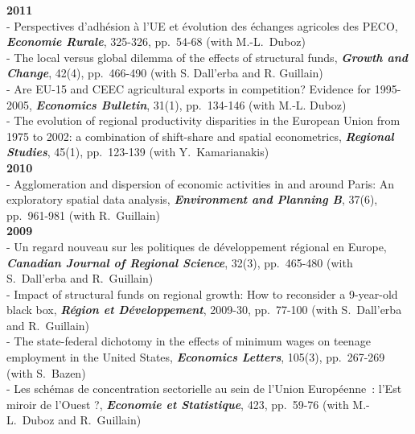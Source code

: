\documentclass[a4paper,12pt]{article}
\begin{document}
\noindent \textbf{2011}  \smallskip \\ 
- Perspectives d'adhésion à l'UE et évolution des échanges agricoles des PECO, \textit{\textbf{Economie Rurale}}, 325-326, pp.~54-68 (with M.-L.~Duboz) \\
- The local versus global dilemma of the effects of structural funds, \textit{\textbf{Growth and Change}}, 42(4), pp.~466-490 (with S. Dall'erba and R. Guillain) \\
- Are EU-15 and CEEC agricultural exports in competition? Evidence for 1995-2005, \textit{\textbf{Economics Bulletin}}, 31(1), pp.~134-146 (with M.-L. Duboz) \\
- The evolution of regional productivity disparities in the European Union from 1975 to 2002: a combination of shift-share and spatial econometrics, \textit{\textbf{Regional Studies}}, 45(1), pp.~123-139 (with Y.~Kamarianakis) \\

\noindent \textbf{2010}  \smallskip \\ 
- Agglomeration and dispersion of economic activities in and around Paris: An exploratory spatial data analysis, \textit{\textbf{Environment and Planning B}}, 37(6), pp.~961-981 (with R.~Guillain) \\

\noindent \textbf{2009}  \smallskip \\ 
- Un regard nouveau sur les politiques de développement régional en Europe, \textit{\textbf{Canadian Journal of Regional Science}}, 32(3), pp.~465-480 (with S.~Dall'erba and R.~Guillain) \\
- Impact of structural funds on regional growth: How to reconsider a 9-year-old black box, \textit{\textbf{Région et Développement}}, 2009-30, pp.~77-100 (with S.~Dall'erba and R.~Guillain) \\
- The state-federal dichotomy in the effects of minimum wages on teenage employment in the United States, \textit{\textbf{Economics Letters}}, 105(3), pp.~267-269 (with S.~Bazen) \\
- Les schémas de concentration sectorielle au sein de l'Union Européenne~: l'Est miroir de l'Ouest ?, \textit{\textbf{Economie et Statistique}}, 423, pp.~59-76 (with M.-L.~Duboz and R.~Guillain) \\
\end{document}
